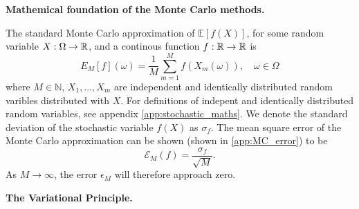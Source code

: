 \textbf{Mathemical foundation of the Monte Carlo methods.}

The standard Monte Carlo approximation of $\mathbb{E}[f(X)]$, for some random variable $X:\Omega\to\mathbb{R}$, and a continous function $f:\mathbb{R}\to\mathbb{R}$ is
\begin{equation}
    E_M[f](\omega)= \frac{1}{M}\sum_{m=1}^Mf(X_m(\omega)), \quad \omega\in\Omega
\end{equation}
where $M\in\mathbb{N}$, $X_1, \dots, X_m$ are independent and identically distributed random varibles distributed with $X$. For definitions of indepent and identically distributed random variables, see appendix \ref{app:stochastic_maths}. We denote the standard deviation of the stochastic variable $f(X)$ as $\sigma_f$. The mean square error of the Monte Carlo approximation can be shown (shown in \ref{app:MC_error}) to be 
\begin{equation}
    \mathcal{E}_M(f) = \frac{\sigma_f}{\sqrt{M}}. 
\end{equation}
As $M\to\infty$, the error $\epsilon_M$ will therefore approach zero.

\textbf{The Variational Principle.}

